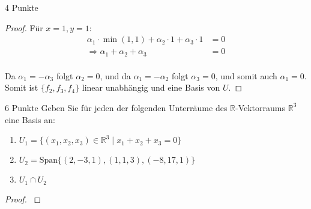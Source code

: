 \documentclass{problemset}
\begin{document}
\begin{problem}{4 Punkte}
\begin{proof}
    Für $x = 1, y = 1$:
    \begin{align*}
        \alpha_1 \cdot \min(1, 1) + \alpha_2 \cdot 1 + \alpha_3 \cdot 1 & = 0 \\
        \Rightarrow \alpha_1 + \alpha_2 + \alpha_3                      & = 0 \\
    \end{align*}

    Da $\alpha_1 = - \alpha_3$ folgt $\alpha_2 = 0$, und da $\alpha_1 = - \alpha_2$
    folgt $\alpha_3 = 0$, und somit auch $\alpha_1 = 0$. Somit ist $\{f_2, f_3,
        f_4\}$ linear unabhängig und eine Basis von $U$.
\end{proof}
\end{problem}

\begin{problem}{6 Punkte}
Geben Sie für jeden der folgenden Unterräume des $\mathbb{R}$-Vektorraums $\mathbb{R}^3$ eine Basis an:
\begin{enumerate}
    \item $U_1 = \{(x_1, x_2, x_3) \in \mathbb{R}^3 \mid x_1 + x_2 + x_3 = 0\}$
    \item $U_2 = \text{Span}\{(2, -3, 1), (1, 1, 3), (-8, 17, 1)\}$
    \item $U_1 \cap U_2$
\end{enumerate}
\begin{proof}
    $ $


\end{proof}
\end{problem}
\end{document}
